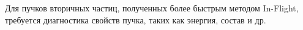 %
%
%
Для пучков вторичных частиц, полученных более быстрым методом In-Flight, требуется диагностика свойств пучка, таких как энергия, состав и др.